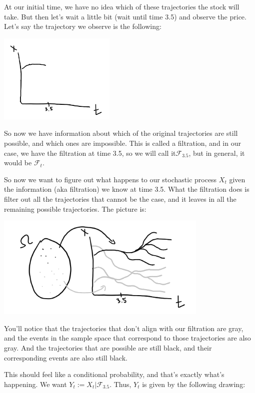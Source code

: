 \documentclass{article}
\begin{document}
At our initial time, we have no idea which of these trajectories the stock will take.  But then let's wait a little bit (wait until time 3.5) and observe the price.  Let's say the trajectory we observe is the following:

\includegraphics[width=2.2in]{filtration_part_2.png}
\centering

So now we have information about which of the original trajectories are still possible, and which ones are impossible. This is called a filtration, and in our case, we have the filtration at time 3.5, so we will call it$\mathcal{F}_{3.5}$, but in general, it would be $\mathcal{F}_{t}$.

So now we want to figure out what happens to our stochastic process $X_t$ given the information (aka filtration) we know at time 3.5. What the filtration does is filter out all the trajectories that cannot be the case, and it leaves in all the remaining possible trajectories.  The picture is:

\includegraphics[width=4in]{filtration_part_3.png}
\centering

You'll notice that the trajectories that don't align with our filtration are gray, and the events in the sample space that correspond to those trajectories are also gray.  And the trajectories that are possible are still black, and their corresponding events are also still black.

This should feel like a conditional probability, and that's exactly what's happening. We want $Y_t := X_t | \mathcal{F}_{3.5}$.  Thus, $Y_t$ is given by the following drawing:
\end{document}
